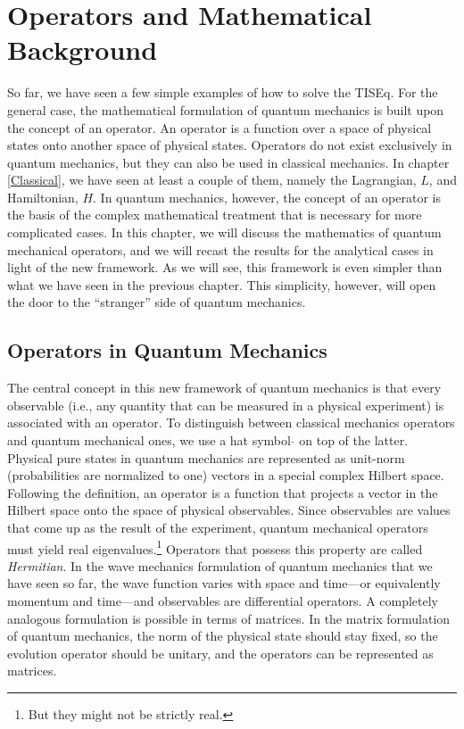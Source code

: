 \documentclass[
  9pt,
]{extbook}
\theoremstyle{definition}
\theoremstyle{definition}
\theoremstyle{definition}
\theoremstyle{remark}
\begin{document}
\hypertarget{Operators}{%
\chapter{Operators and Mathematical Background}\label{Operators}}

So far, we have seen a few simple examples of how to solve the TISEq. For the general case, the mathematical formulation of quantum mechanics is built upon the concept of an operator. An operator is a function over a space of physical states onto another space of physical states. Operators do not exist exclusively in quantum mechanics, but they can also be used in classical mechanics. In chapter \ref{Classical}, we have seen at least a couple of them, namely the Lagrangian, \(L\), and Hamiltonian, \(H\). In quantum mechanics, however, the concept of an operator is the basis of the complex mathematical treatment that is necessary for more complicated cases. In this chapter, we will discuss the mathematics of quantum mechanical operators, and we will recast the results for the analytical cases in light of the new framework. As we will see, this framework is even simpler than what we have seen in the previous chapter. This simplicity, however, will open the door to the ``stranger'' side of quantum mechanics.

\hypertarget{operators-in-quantum-mechanics}{%
\section{Operators in Quantum Mechanics}\label{operators-in-quantum-mechanics}}

The central concept in this new framework of quantum mechanics is that every observable (i.e., any quantity that can be measured in a physical experiment) is associated with an operator. To distinguish between classical mechanics operators and quantum mechanical ones, we use a hat symbol \(\hat{}\) on top of the latter. Physical pure states in quantum mechanics are represented as unit-norm (probabilities are normalized to one) vectors in a special complex Hilbert space. Following the definition, an operator is a function that projects a vector in the Hilbert space onto the space of physical observables. Since observables are values that come up as the result of the experiment, quantum mechanical operators must yield real eigenvalues.\footnote{But they might not be strictly real.} Operators that possess this property are called \emph{Hermitian}.
In the wave mechanics formulation of quantum mechanics that we have seen so far, the wave function varies with space and time---or equivalently momentum and time---and observables are differential operators. A completely analogous formulation is possible in terms of matrices. In the matrix formulation of quantum mechanics, the norm of the physical state should stay fixed, so the evolution operator should be unitary, and the operators can be represented as matrices.
\end{document}
